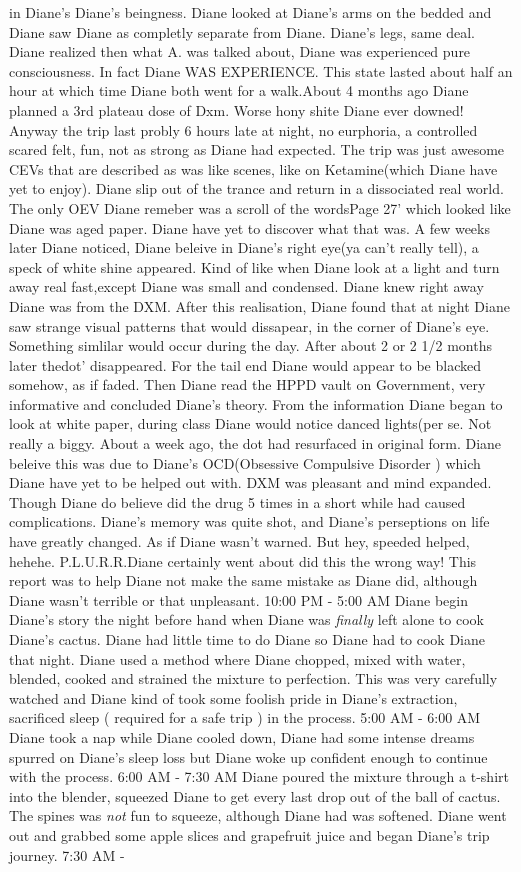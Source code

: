 \documentclass[12pt]{book}
\begin{document}
in Diane's Diane's beingness. Diane looked at Diane's arms on the bedded and Diane saw Diane as completly separate from Diane. Diane's legs, same deal. Diane realized then what A. was talked about, Diane was experienced pure consciousness. In fact Diane WAS EXPERIENCE. This state lasted about half an hour at which time Diane both went for a walk.About 4 months ago Diane planned a 3rd plateau dose of Dxm. Worse hony shite Diane ever downed! Anyway the trip last probly 6 hours late at night, no eurphoria, a controlled scared felt, fun, not as strong as Diane had expected. The trip was just awesome CEVs that are described as was like scenes, like on Ketamine(which Diane have yet to enjoy). Diane slip out of the trance and return in a dissociated real world. The only OEV Diane remeber was a scroll of the wordsPage 27' which looked like Diane was aged paper. Diane have yet to discover what that was. A few weeks later Diane noticed, Diane beleive in Diane's right eye(ya can't really tell), a speck of white shine appeared. Kind of like when Diane look at a light and turn away real fast,except Diane was small and condensed. Diane knew right away Diane was from the DXM. After this realisation, Diane found that at night Diane saw strange visual patterns that would dissapear, in the corner of Diane's eye. Something simlilar would occur during the day. After about 2 or 2 1/2 months later thedot' disappeared. For the tail end Diane would appear to be blacked somehow, as if faded. Then Diane read the HPPD vault on Government, very informative and concluded Diane's theory. From the information Diane began to look at white paper, during class Diane would notice danced lights(per se. Not really a biggy. About a week ago, the dot had resurfaced in original form. Diane beleive this was due to Diane's OCD(Obsessive Compulsive Disorder ) which Diane have yet to be helped out with. DXM was pleasant and mind expanded. Though Diane do believe did the drug 5 times in a short while had caused complications. Diane's memory was quite shot, and Diane's perseptions on life have greatly changed. As if Diane wasn't warned. But hey, speeded helped, hehehe. P.L.U.R.R.Diane certainly went about did this the wrong way! This report was to help Diane not make the same mistake as Diane did, although Diane wasn't terrible or that unpleasant. 10:00 PM - 5:00 AM Diane begin Diane's story the night before hand when Diane was \emph{finally} left alone to cook Diane's cactus. Diane had little time to do Diane so Diane had to cook Diane that night. Diane used a method where Diane chopped, mixed with water, blended, cooked and strained the mixture to perfection. This was very carefully watched and Diane kind of took some foolish pride in Diane's extraction, sacrificed sleep ( required for a safe trip ) in the process. 5:00 AM - 6:00 AM Diane took a nap while Diane cooled down, Diane had some intense dreams spurred on Diane's sleep loss but Diane woke up confident enough to continue with the process. 6:00 AM - 7:30 AM Diane poured the mixture through a t-shirt into the blender, squeezed Diane to get every last drop out of the ball of cactus. The spines was \emph{not} fun to squeeze, although Diane had was softened. Diane went out and grabbed some apple slices and grapefruit juice and began Diane's trip journey. 7:30 AM - 
\end{document}
